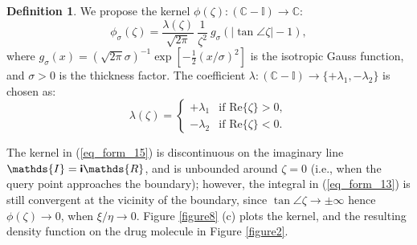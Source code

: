 \documentclass[article]{gmp2014}
\theoremstyle{definition}
\newtheorem{defn}{\textsf{\textbf{{Definition}}}}
\newcommand{\ii}{\text{\textsf{\textbf{i}}}}
\begin{document}
%
\begin{defn}
    We propose the kernel $\phi(\zeta): (\mathds{C} - \mathds{I}) \rightarrow \mathds{C}$:
    \begin{equation}
        \phi_\sigma(\zeta) = \frac{\lambda(\zeta)}{\sqrt{2\pi}} ~\frac{1}{\zeta^2}~ g_\sigma \left( |\tan \angle \zeta| - 1 \right), \label{eq_form_15}
    \end{equation}
    where $g_\sigma(x) = (\sqrt{2\pi}\sigma)^{-1} \exp[-\frac{1}{2}(x/\sigma)^2]$ is the isotropic Gauss function, and $\sigma > 0$ is the thickness factor. The coefficient $\lambda: (\mathds{C} - \mathds{I}) \rightarrow \{+\lambda_1, -\lambda_2\}$ is chosen as:
    \begin{equation}
        \lambda(\zeta) =
        \begin{cases}
            +\lambda_1 & \text{if } \mathrm{Re}\{ \zeta \} > 0,\\
            -\lambda_2 & \text{if } \mathrm{Re}\{ \zeta \} < 0.
        \end{cases}\label{eq_form_16c}
    \end{equation}
\end{defn}
%
The kernel in (\ref{eq_form_15}) is discontinuous on the imaginary line $\mathds{I} = \ii\mathds{R}$, and is unbounded around $\zeta = 0$ (i.e., when the query point approaches the boundary); however, the integral in (\ref{eq_form_13}) is still convergent at the vicinity of the boundary, since $\tan \angle \zeta \rightarrow \pm\infty$ hence $\phi(\zeta) \rightarrow 0$, when $\xi/\eta \rightarrow 0$. Figure \ref{figure8} (c) plots the kernel, and the resulting density function on the drug molecule in Figure \ref{figure2}.
\end{document}
